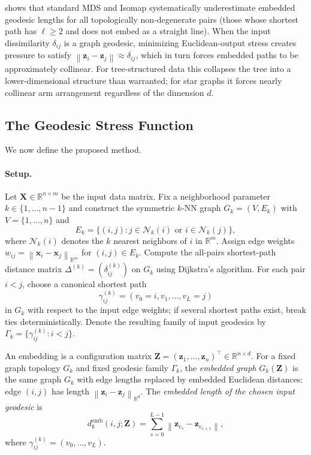 \documentclass[11pt]{article}
\theoremstyle{definition}
\newcommand{\R}{\mathbb{R}}
\newcommand{\bx}{\mathbf{x}}
\newcommand{\bX}{\mathbf{X}}
\newcommand{\bz}{\mathbf{z}}
\newcommand{\bZ}{\mathbf{Z}}
\newcommand{\norm}[1]{\left\|#1\right\|}
\newcommand{\demb}{d^{\mathrm{emb}}}
\newcommand{\Gk}{G_k}
\begin{document}
 shows that standard MDS and Isomap systematically
underestimate embedded geodesic lengths for all topologically
non-degenerate pairs (those whose shortest path has $\ell \geq 2$ and
does not embed as a straight line).  When the input dissimilarity
$\delta_{ij}$ is a graph geodesic, minimizing Euclidean-output stress
creates pressure to satisfy $\norm{\bz_i - \bz_j} \approx \delta_{ij}$,
which in turn forces embedded paths to be approximately collinear.
For tree-structured data this collapses the tree into a lower-dimensional
structure than warranted; for star graphs it forces nearly collinear arm
arrangement regardless of the dimension $d$.

\subsection{The Geodesic Stress Function}
\label{sec:geodesic_stress}

We now define the proposed method.

\paragraph{Setup.}
Let $\bX \in \R^{n \times m}$ be the input data matrix.  Fix a neighborhood
parameter $k \in \{1, \ldots, n-1\}$ and construct the symmetric $k$-NN
graph $\Gk = (V, E_k)$ with $V = \{1, \ldots, n\}$ and
\begin{equation}
  E_k = \{(i,j) : j \in \mathcal{N}_k(i) \text{ or } i \in \mathcal{N}_k(j)\},
  \label{eq:knn_edges}
\end{equation}
where $\mathcal{N}_k(i)$ denotes the $k$ nearest neighbors of $i$ in $\R^m$.
Assign edge weights $w_{ij} = \norm{\bx_i - \bx_j}_{\R^m}$ for $(i,j)
\in E_k$.  Compute the all-pairs shortest-path distance matrix
$\Delta^{(k)} = (\delta^{(k)}_{ij})$ on $\Gk$ using Dijkstra's algorithm.
For each pair $i < j$, choose a canonical shortest path
\begin{equation}
  \gamma_{ij}^{(k)} = (v_0 = i, v_1, \ldots, v_L = j)
\end{equation}
in $\Gk$ with respect to the input edge weights; if several shortest
paths exist, break ties deterministically.  Denote the resulting family
of input geodesics by $\Gamma_k = \{\gamma_{ij}^{(k)} : i < j\}$.

An embedding is a configuration matrix $\bZ = (\bz_1, \ldots, \bz_n)^\top
\in \R^{n \times d}$.  For a fixed graph topology $\Gk$ and fixed
geodesic family $\Gamma_k$, the
\emph{embedded graph} $\Gk(\bZ)$ is the same graph $\Gk$ with edge lengths
replaced by embedded Euclidean distances: edge $(i,j)$ has length
$\norm{\bz_i - \bz_j}_{\R^d}$.  The \emph{embedded length of the chosen
input geodesic} is
\begin{equation}
  \demb_{k}(i,j;\bZ)
  = \sum_{s=0}^{L-1} \norm{\bz_{v_s} - \bz_{v_{s+1}}},
  \label{eq:emb_geodesic}
\end{equation}
where $\gamma_{ij}^{(k)} = (v_0, \ldots, v_L)$.
\end{document}
